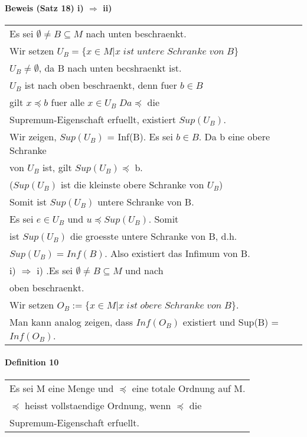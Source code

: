 \documentclass{scrartcl}
\begin{document}
\paragraph{Beweis (Satz 18) i) $ \Rightarrow $ ii)}
\begin{tabbing}
\begin{tabular}{l}
Es sei $ \emptyset \neq B \subseteq M $ nach unten beschraenkt.\\
Wir setzen $ U_B = \{ x \in M | x\;ist\;untere\;Schranke\;von\;B \} $ \\ 
$ U_B  \neq \emptyset $, da B nach unten becshraenkt ist.\\
$ U_B $ ist nach oben beschraenkt, denn fuer $ b\in B $ \\
gilt $ x \preceq b $ fuer alle $ x\in U_B \; Da \preceq $ die \\
Supremum-Eigenschaft erfuellt, existiert $ Sup(U_B)$.\\
Wir zeigen, $Sup(U_B)$ = Inf(B). Es sei $ b\in B $. Da b eine obere Schranke\\
von $U_B$ ist, gilt $Sup(U_B) \preceq $ b.\\
($Sup(U_B)$ ist die kleinste obere Schranke von $ U_B $)\\
Somit ist $Sup(U_B)$ untere Schranke von B.\\
Es sei $ e\in U_B $ und $ u \preceq Sup(U_B) $. Somit\\
ist $Sup(U_B)$ die groesste untere Schranke von B, d.h.\\
$Sup(U_B) = Inf(B)$. Also existiert das Infimum von B.\\
i) $ \Rightarrow $ i) .Es sei $ \emptyset \neq B \subseteq M $ und nach \\
oben beschraenkt.\\
Wir setzen $ O_B :=\{ x\in M | x\;ist\;obere\;Schranke\;von\;B \}$.\\
Man kann analog zeigen, dass $Inf(O_B)$ existiert und Sup(B) = $Inf(O_B)$. 
\end{tabular}
\end{tabbing}

\paragraph{Definition 10}
\begin{tabbing}
\begin{tabular}{l}
Es sei M eine Menge und $ \preceq $ eine totale Ordnung auf M.\\
$\preceq$ heisst vollstaendige Ordnung, wenn $\preceq$ die\\
Supremum-Eigenschaft erfuellt.
\end{tabular}
\end{tabbing}
\end{document}
